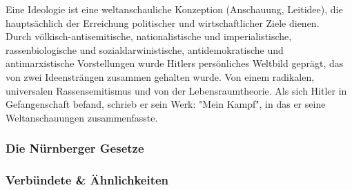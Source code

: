 \documentclass[letterpaper, 12pt]{article}
\let\tempsubsubsection\subsubsection
\renewcommand\subsubsection[1]{\vspace{0cm}\tempsubsubsection{#1}\vspace{0cm}}
\begin{document}

Eine Ideologie ist eine weltanschauliche Konzeption (Anschauung, Leitidee), die hauptsächlich der Erreichung politischer und wirtschaftlicher Ziele dienen. \\
Durch völkisch-antisemitische, nationalistische und imperialistische, rassenbiologische und sozialdarwinistische, antidemokratische und antimarxistische Vorstellungen wurde Hitlers persönliches Weltbild geprägt, das von zwei Ideensträngen zusammen gehalten wurde. Von einem radikalen, universalen Rassensemitismus und von der Lebensraumtheorie. Als sich Hitler in Gefangenschaft befand, schrieb er sein Werk: "Mein Kampf", in das er seine Weltanschauungen zusammenfasste. \\






\subsubsection{Die Nürnberger Gesetze}

\subsubsection{Verbündete \& Ähnlichkeiten}

\clearpage


\end{document}
